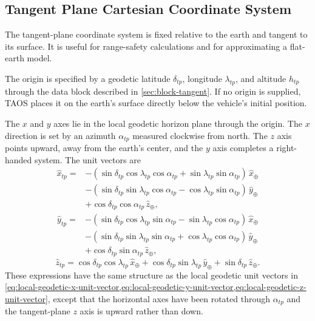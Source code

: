 \subsection{Tangent Plane Cartesian Coordinate System}\label{sec:tangent-plane}

The tangent-plane coordinate system is fixed relative to the earth and tangent to its
surface. It is useful for range-safety calculations and for approximating a flat-earth
model.

The origin is specified by a geodetic latitude $\delta_{tp}$, longitude
$\lambda_{tp}$, and altitude $h_{tp}$ through the  data
block described in \cref{sec:block-tangent}. If no origin is supplied, TAOS places
it on the earth's surface directly below the vehicle's initial position.

The $x$ and $y$ axes lie in the local geodetic horizon plane through the origin. The
$x$ direction is set by an azimuth $\alpha_{tp}$ measured clockwise from north. The
$z$ axis points upward, away from the earth's center, and the $y$ axis completes a
right-handed system. The unit vectors are
\begin{equation}
  \begin{aligned}
  \hat x_{tp}={}&-
  (\sin\delta_{tp}\cos\lambda_{tp}\cos\alpha_{tp}
   +\sin\lambda_{tp}\sin\alpha_{tp})\,\hat x_{\oplus}\\
  &-
  (\sin\delta_{tp}\sin\lambda_{tp}\cos\alpha_{tp}
   -\cos\lambda_{tp}\sin\alpha_{tp})\,\hat y_{\oplus}\\
  &+\cos\delta_{tp}\cos\alpha_{tp}\,\hat z_{\oplus},
  \end{aligned}
  \label{eq:tangent-plane-x-unit-vector}
\end{equation}
\begin{equation}
  \begin{aligned}
  \hat y_{tp}={}&-
  (\sin\delta_{tp}\cos\lambda_{tp}\sin\alpha_{tp}
   -\sin\lambda_{tp}\cos\alpha_{tp})\,\hat x_{\oplus}\\
  &-
  (\sin\delta_{tp}\sin\lambda_{tp}\sin\alpha_{tp}
   +\cos\lambda_{tp}\cos\alpha_{tp})\,\hat y_{\oplus}\\
  &+\cos\delta_{tp}\sin\alpha_{tp}\,\hat z_{\oplus},
  \end{aligned}
  \label{eq:tangent-plane-y-unit-vector}
\end{equation}
\begin{equation}
  \hat z_{tp}
  =\cos\delta_{tp}\cos\lambda_{tp}\,\hat x_{\oplus}
  +\cos\delta_{tp}\sin\lambda_{tp}\,\hat y_{\oplus}
  +\sin\delta_{tp}\,\hat z_{\oplus}.
  \label{eq:tangent-plane-z-unit-vector}
\end{equation}
These expressions have the same structure as the local geodetic unit vectors in
\cref{eq:local-geodetic-x-unit-vector,eq:local-geodetic-y-unit-vector,eq:local-geodetic-z-unit-vector}, except that the horizontal axes have been rotated
through $\alpha_{tp}$ and the tangent-plane $z$ axis is upward rather than down.

